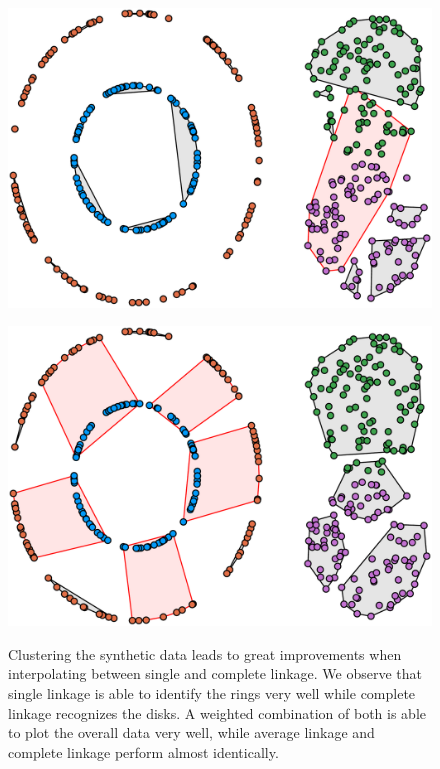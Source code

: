 \begin{figure}[h]
\begin{minipage}{.45\textwidth}
\end{minipage}
\begin{minipage}{.45\textwidth}
  \centering
  {\includegraphics[width=\linewidth]{plots/single_linkage_370}}
\end{minipage}\qquad
\begin{minipage}{.45\textwidth}
  \centering
  {\includegraphics[width=\linewidth]{plots/complete_linkage_389}}
\end{minipage}
\caption{%
  Clustering the synthetic data leads to great improvements when interpolating between single and complete linkage. We observe that single linkage is able to identify the rings very well while complete linkage recognizes the disks. A weighted combination of both is able to plot the overall data very well, while average linkage and complete linkage perform almost identically.
  }
\label{fig:syntheticexperiments}
\end{figure}

